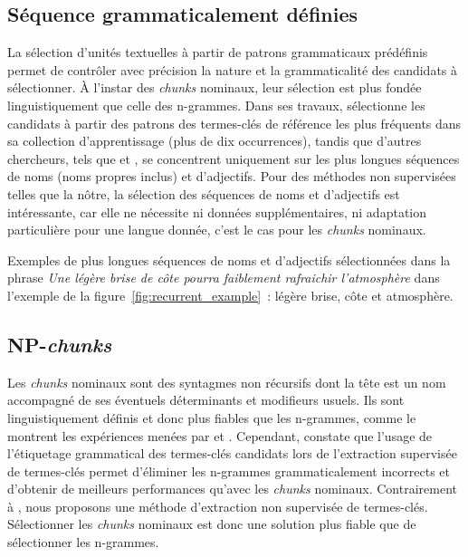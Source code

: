       \subsection{Séquence grammaticalement définies}
      \label{subsec:main-state_of_the_art-automatic_keyphrase_extraction-automatic_keyphrase_extraction-pos_sequences}
        La sélection d'unités textuelles à partir de patrons grammaticaux
        prédéfinis permet de contrôler avec précision la nature et la
        grammaticalité des candidats à sélectionner. À l'instar des
        \textit{chunks} nominaux, leur sélection est plus fondée
        linguistiquement que celle des n-grammes. Dans ses travaux,
         sélectionne les candidats à partir
        des patrons des termes-clés de référence les plus fréquents dans sa
        collection d'apprentissage (plus de dix occurrences), tandis que
        d'autres chercheurs, tels que  et
        , se concentrent uniquement sur les plus
        longues séquences de noms (noms propres inclus) et d'adjectifs. Pour des
        méthodes non supervisées telles que la nôtre, la sélection des séquences
        de noms et d'adjectifs est intéressante, car elle ne nécessite ni
        données supplémentaires, ni adaptation particulière pour une langue
        donnée, c'est le cas pour les \textit{chunks} nominaux.

        Exemples de plus longues séquences de noms et d'adjectifs sélectionnées
        dans la phrase \textit{\og{}Une légère brise de côte pourra faiblement
        rafraichir l'atmosphère\fg{}} dans l'exemple de la
        figure~\ref{fig:recurrent_example}~: \og{}légère brise\fg{},
        \og{}côte\fg{} et \og{}atmosphère\fg{}.

      \subsection{NP-\textit{chunks}}
      \label{subsec:main-state_of_the_art-automatic_keyphrase_extraction-automatic_keyphrase_extraction-np_chunks}
        Les \textit{chunks} nominaux sont des syntagmes non récursifs dont la
        tête est un nom accompagné de ses éventuels déterminants et modifieurs
        usuels. Ils sont linguistiquement définis et donc plus fiables que les
        n-grammes, comme le montrent les expériences menées par
         et .
        Cependant,  constate que l'usage de
        l'étiquetage grammatical des termes-clés candidats lors de l'extraction
        supervisée de termes-clés permet d'éliminer les n-grammes
        grammaticalement incorrects et d'obtenir de meilleurs performances
        qu'avec les \textit{chunks} nominaux. Contrairement à
        , nous proposons une méthode
        d'extraction non supervisée de termes-clés. Sélectionner les
        \textit{chunks} nominaux est donc une solution plus fiable que de
        sélectionner les n-grammes.

